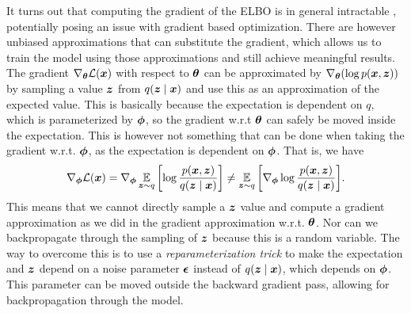 It turns out that computing the gradient of the ELBO is in general intractable \cite{kingma2017variational}, potentially posing an issue with gradient based optimization. There are however unbiased approximations that can substitute the gradient, which allows us to train the model using those approximations and still achieve meaningful results. The gradient $\nabla_{\bm{ \theta }} \mathcal{L}(\bm{ x })$ with respect to $\bm{ \theta }$ can be approximated by $\nabla_{\bm{ \theta }}{\mathopen{} \left( \log p(\bm{ x }, \bm{ z }) \right) \mathclose{}}$ by sampling a value $\bm{ z }$ from $q(\bm{ z } \mid \bm{ x })$ and use this as an approximation of the expected value. This is basically because the expectation is dependent on $q$, which is parameterized by $\bm{ \phi }$, so the gradient w.r.t $\bm{ \theta }$ can safely be moved inside the expectation. This is however not something that can be done when taking the gradient w.r.t. $\bm{ \phi }$, as the expectation is dependent on $\bm{ \phi }$. That is, we have
\[ \nabla_{\bm{ \phi }}\mathcal{L}(\bm{ x }) = \nabla_{\bm{ \phi }} \operatorname*{\mathbb{E}}_{\bm{ z }\sim q}{\mathopen{} \left[ \log \frac{p(\bm{ x }, \bm{ z })}{q(\bm{ z } \mid \bm{ x })} \right] \mathclose{}} \neq \operatorname*{\mathbb{E}}_{\bm{ z }\sim q}{\mathopen{} \left[ \nabla_{\bm{ \phi }} \log \frac{p(\bm{ x }, \bm{ z })}{q(\bm{ z } \mid \bm{ x })} \right] \mathclose{}}. \]
This means that we cannot directly sample a $\bm{ z }$ value and compute a gradient approximation as we did in the gradient approximation w.r.t. $\bm{ \theta }$. Nor can we backpropagate through the sampling of $\bm{ z }$ because this is a random variable. The way to overcome this is to use a \textit{reparameterization trick} to make the expectation and $\bm{ z }$ depend on a noise parameter $\bm{ \epsilon }$ instead of $q(\bm{ z } \mid \bm{ x })$, which depends on $\bm{ \phi }$. This parameter can be moved outside the backward gradient pass, allowing for backpropagation through the model.

